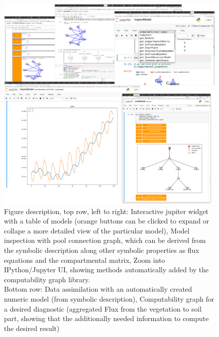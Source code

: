 \begin{figure}[h]
  \label{fig:overview}
\includegraphics[width=\columnwidth]{TabScreenCombined.pdf}
  \caption{
      Figure description, top row, left to right: Interactive jupiter widget
      with a table of models (orange buttons can be clicked to expand or
      collape a more detailed view of the particular model), Model inspection
      with pool connection graph, which can be derived from the symbolic
      description along other symbolic properties as flux equations and the
      compartmental matrix, Zoom into IPython/Jupyter UI, showing methods
      automatically added by the computability graph library.  \\ Bottom row:
      Data assimilation with an automatically created numeric model (from
      symbolic description), Computability graph for a desired diagnostic
      (aggregated Flux from the vegetation to soil part, showing that the
      additionally needed information to compute the desired result)
  }
\end{figure}

